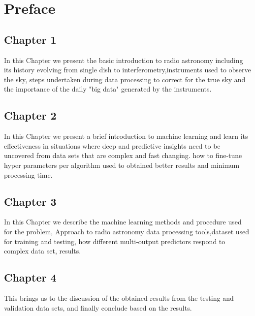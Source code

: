 \chapter*{Preface}

\section*{Chapter 1}
In this Chapter we present the basic introduction to radio astronomy including its history evolving from single dish to interferometry,instruments used to observe the sky, steps undertaken during data processing to correct for the true sky and the importance of the daily "big data" generated by the instruments.    
\section*{Chapter 2}
In this Chapter we present a brief introduction to machine learning and learn its effectiveness in situations where deep and predictive insights need to be uncovered from data sets that are complex and fast changing. how to fine-tune hyper parameters per algorithm used to obtained better results and minimum processing time.  
\section*{Chapter 3}
In this Chapter we describe the machine learning methods and procedure used for the problem, Approach to radio astronomy data processing tools,dataset used for training and testing, how different multi-output predictors respond to complex data set, results.
\section*{Chapter 4}
This brings us to the discussion of the obtained results from the testing and validation data sets, and finally conclude based on the results. 
